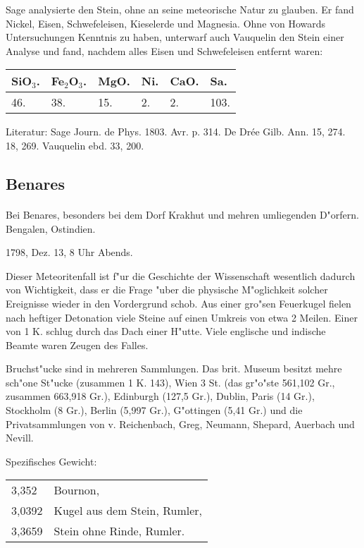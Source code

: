 \documentclass[a4paper, 11pt, oneside]{article}
\begin{document}
Sage analysierte den Stein, ohne an seine meteorische Natur zu glauben. Er fand Nickel, Eisen, Schwefeleisen, Kieselerde und Magnesia. Ohne von Howards Untersuchungen Kenntnis zu haben, unterwarf auch Vauquelin den Stein einer Analyse und fand, nachdem alles Eisen und Schwefeleisen entfernt waren:
\begin{table}[!ht]
    \centering
    \begin{tabular}{l l l l l l}
        SiO$_{3}$. & Fe$_{2}$O$_{3}$. & MgO. & Ni. & CaO. & Sa. \\ \hline
        46. & 38. & 15. & 2. & 2. & 103. \\
    \end{tabular}
\end{table}

\footnotesize
Literatur: Sage Journ. de Phys. 1803. Avr. p. 314. De Drée Gilb. Ann. 15, 274. 18, 269. Vauquelin ebd. 33, 200.
\subsection{Benares}
\normalsize
\paragraph{}
Bei Benares, besonders bei dem Dorf Krakhut und mehren umliegenden D"orfern. Bengalen, Ostindien.

1798, Dez. 13, 8 Uhr Abends.

Dieser Meteoritenfall ist f"ur die Geschichte der Wissenschaft wesentlich dadurch von Wichtigkeit, dass er die Frage "uber die physische M"oglichkeit solcher Ereignisse wieder in den Vordergrund schob. Aus einer gro"sen Feuerkugel fielen nach heftiger Detonation viele Steine auf einen Umkreis von etwa 2 Meilen. Einer von 1 K. schlug durch das Dach einer H"utte. Viele englische und indische Beamte waren Zeugen des Falles.

Bruchst"ucke sind in mehreren Sammlungen. Das brit. Museum besitzt mehre sch"one St"ucke (zusammen 1 K. 143), Wien 3 St. (das gr"o"ste 561,102 Gr., zusammen 663,918 Gr.), Edinburgh (127,5 Gr.), Dublin, Paris (14 Gr.), Stockholm (8 Gr.), Berlin (5,997 Gr.), G"ottingen (5,41 Gr.) und die Privatsammlungen von v. Reichenbach, Greg, Neumann, Shepard, Auerbach und Nevill.

Spezifisches Gewicht:
\begin{table}[!ht]
    \centering
    \begin{tabular}{l l}
        3,352 & Bournon,\\
        3,0392 & Kugel aus dem Stein, Rumler,\\
        3,3659 & Stein ohne Rinde, Rumler.
    \end{tabular}
\end{table}
\end{document}
